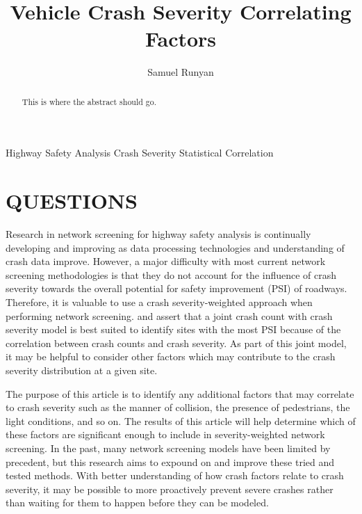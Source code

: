 \documentclass[3p, authoryear]{elsarticle} %
\begin{document}
\begin{frontmatter}

  \title{Vehicle Crash Severity Correlating Factors}
    \author[Brigham Young University]{Samuel Runyan}
      \address[Brigham Young University]{Civil and Environmental Engineering Department, 430 Engineering Building, Provo, Utah 84602}
    
  \begin{abstract}
  This is where the abstract should go.
  \end{abstract}
   \begin{keyword} Highway Safety Analysis Crash Severity Statistical Correlation\end{keyword}
 \end{frontmatter}

\hypertarget{intro}{%
\section{QUESTIONS}\label{intro}}

Research in network screening for highway safety analysis is continually developing and improving as data processing technologies and understanding of crash data improve. However, a major difficulty with most current network screening methodologies is that they do not account for the influence of crash severity towards the overall potential for safety improvement (PSI) of roadways. Therefore, it is valuable to use a crash severity-weighted approach when performing network screening. \citet{yasmin2018} and \citet{afghari2020} assert that a joint crash count with crash severity model is best suited to identify sites with the most PSI because of the correlation between crash counts and crash severity. As part of this joint model, it may be helpful to consider other factors which may contribute to the crash severity distribution at a given site.

The purpose of this article is to identify any additional factors that may correlate to crash severity such as the manner of collision, the presence of pedestrians, the light conditions, and so on. The results of this article will help determine which of these factors are significant enough to include in severity-weighted network screening. In the past, many network screening models have been limited by precedent, but this research aims to expound on and improve these tried and tested methods. With better understanding of how crash factors relate to crash severity, it may be possible to more proactively prevent severe crashes rather than waiting for them to happen before they can be modeled.
\end{document}
